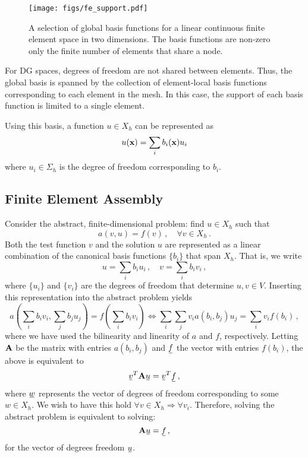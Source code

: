 \documentclass[../doc.tex]{subfiles}
\begin{document}
\begin{figure}
\centering
\texttt{[image: figs/fe\_support.pdf]}
\caption{A selection of global basis functions for a linear continuous finite element space in two dimensions. The basis functions are non-zero only the finite number of elements that share a node. }
\label{fem:fe_support}
\end{figure}

For DG spaces, degrees of freedom are not shared between elements. Thus, the global basis is spanned by the collection of element-local basis functions corresponding to each element in the mesh. In this case, the support of each basis function is limited to a single element. 

Using this basis, a function $u \in X_h$ can be represented as 
	\begin{equation}
		u(\boldsymbol{\mathrm{x}}) = \sum_i b_i(\boldsymbol{\mathrm{x}}) u_i 
	\end{equation}
where $u_i \in \Sigma_h$ is the degree of freedom corresponding to $b_i$. 

\subsection{Finite Element Assembly}
Consider the abstract, finite-dimensional problem: find $u \in X_h$ such that 
	\begin{equation}
		a(v,u) = f(v) \,, \quad \forall v \in X_h \,. 
	\end{equation}
Both the test function $v$ and the solution $u$ are represented as a linear combination of the canonical basis functions $\{b_i\}$ that span $X_h$. That is, we write 
	\begin{equation}
		u = \sum_i b_i u_i \,, \quad v = \sum_i b_i v_i \,,
	\end{equation}
where $\{u_i\}$ and $\{v_i\}$ are the degrees of freedom that determine $u,v \in V$. Inserting this representation into the abstract problem yields 
	\begin{equation}
		a(\sum_i b_i v_i, \sum_j b_j u_j) = f(\sum_i b_i v_i) \iff \sum_i \sum_j v_i a(b_i,b_j) u_j = \sum_i v_i f(b_i) \,, 
	\end{equation} 
where we have used the bilinearity and linearity of $a$ and $f$, respectively. 
Letting $\boldsymbol{\mathrm{A}}$ be the matrix with entries $a(b_i, b_j)$ and $\ubar{f}$ the vector with entries $f(b_i)$, the above is equivalent to 
	\begin{equation}
		\ubar{v}^T \mat{A} \ubar{u} = \ubar{v}^T \ubar{f} \,, 
	\end{equation}
where $\ubar{w}$ represents the vector of degrees of freedom corresponding to some $w \in X_h$. 
We wish to have this hold $\forall v \in X_h \Rightarrow \forall v_i$. Therefore, solving the abstract problem is equivalent to solving: 
	\begin{equation}
		\mat{A} \ubar{u} = \ubar{f} \,, 
	\end{equation}
for the vector of degrees freedom $\ubar{u}$. 
\end{document}
